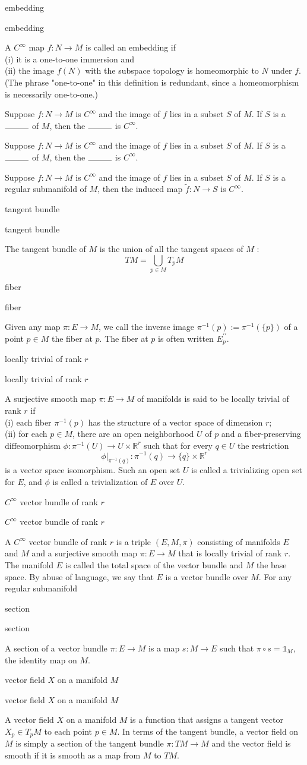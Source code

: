 \documentclass[17pt]{extarticle}
\newcommand{\boxset}[2]{\begin{mdframed}[style=darkQuesion]
#1
\end{mdframed}
\newpage
\begin{mdframed}[style=darkQuesion]
  #1
    \end{mdframed}
\begin{mdframed}[style=darkAnswer]
  #2
    \end{mdframed}
    \newpage
}
\begin{document}
\boxset{embedding}
{A $C^{\infty}$ map $f: N \rightarrow M$ is called an embedding if\[\ \]
(i) it is a one-to-one immersion and\[\ \]
(ii) the image $f(N)$ with the subspace topology is homeomorphic to $N$ under $f$. (The phrase "one-to-one" in this definition is redundant, since a homeomorphism is necessarily one-to-one.)}
\boxset{Suppose $f: N \rightarrow M$ is $C^{\infty}$ and the image of $f$ lies in a subset $S$ of $M$. If $S$ is a $\rule{1cm}{0.15mm}$ of $M$, then the $\rule{1cm}{0.15mm}$ is $C^{\infty}$.}
{Suppose $f: N \rightarrow M$ is $C^{\infty}$ and the image of $f$ lies in a subset $S$ of $M$. If $S$ is a regular submanifold of $M$, then the induced map $\tilde{f}: N \rightarrow S$ is $C^{\infty}$.}
\boxset{tangent bundle}
{The tangent bundle of $M$ is the union of all the tangent spaces of $M$ :
\[T M=\bigcup_{p \in M} T_{p} M\]}
\boxset{fiber}
{Given any map $\pi: E \rightarrow M$, we call the inverse image $\pi^{-1}(p):=\pi^{-1}(\{p\})$ of a point $p \in M$ the fiber at $p$. The fiber at $p$ is often written $E_{p}^{\prime \prime}$.}
\boxset{locally trivial of rank $r$}
{A surjective smooth map $\pi: E \rightarrow M$ of manifolds is said to be locally trivial of rank $r$ if\[\ \]
(i) each fiber $\pi^{-1}(p)$ has the structure of a vector space of dimension $r$;\[\ \]
(ii) for each $p \in M$, there are an open neighborhood $U$ of $p$ and a fiber-preserving diffeomorphism $\phi: \pi^{-1}(U) \rightarrow U \times \mathbb{R}^{r}$ such that for every $q \in U$ the restriction
\[\left.\phi\right|_{\pi^{-1}(q)}: \pi^{-1}(q) \rightarrow\{q\} \times \mathbb{R}^{r}\]
is a vector space isomorphism. Such an open set $U$ is called a trivializing open set for $E$, and $\phi$ is called a trivialization of $E$ over $U$.}
\boxset{$C^{\infty}$ vector bundle of rank $r$}
{A $C^{\infty}$ vector bundle of rank $r$ is a triple $(E, M, \pi)$ consisting of manifolds $E$ and $M$ and a surjective smooth map $\pi: E \rightarrow M$ that is locally trivial of rank $r$. The manifold $E$ is called the total space of the vector bundle and $M$ the base space. By abuse of language, we say that $E$ is a vector bundle over $M$. For any regular submanifold}
\boxset{section}
{A section of a vector bundle $\pi: E \rightarrow M$ is a map $s: M \rightarrow E$ such that $\pi \circ s=\mathbb{1}_{M}$, the identity map on $M$.}
\boxset{vector field $X$ on a manifold $M$}
{A vector field $X$ on a manifold $M$ is a function that assigns a tangent vector $X_{p} \in T_{p} M$ to each point $p \in M$. In terms of the tangent bundle, a vector field on $M$ is simply a section of the tangent bundle $\pi: T M \rightarrow M$ and the vector field is smooth if it is smooth as a map from $M$ to $T M$.}
\end{document}
